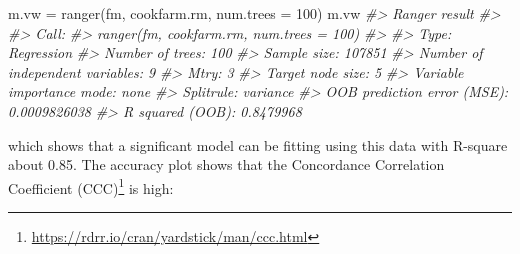 \documentclass[
  graybox,natbib,nospthms]{svmono}
\newenvironment{Shaded}{\begin{snugshade}}{\end{snugshade}}
\newcommand{\AttributeTok}[1]{\textcolor[rgb]{0.61,0.61,0.61}{#1}}
\newcommand{\CommentTok}[1]{\textcolor[rgb]{0.37,0.37,0.37}{\textit{#1}}}
\newcommand{\ConstantTok}[1]{\textcolor[rgb]{0,0,0}{#1}}
\newcommand{\DecValTok}[1]{\textcolor[rgb]{0.06,0.06,0.06}{#1}}
\newcommand{\FloatTok}[1]{\textcolor[rgb]{0.06,0.06,0.06}{#1}}
\newcommand{\FunctionTok}[1]{\textcolor[rgb]{0,0,0}{#1}}
\newcommand{\NormalTok}[1]{#1}
\newcommand{\OtherTok}[1]{\textcolor[rgb]{0.37,0.37,0.37}{#1}}
\newcommand{\SpecialCharTok}[1]{\textcolor[rgb]{0,0,0}{#1}}
\newcommand{\StringTok}[1]{\textcolor[rgb]{0.5,0.5,0.5}{#1}}
\renewcommand{\href}[2]{#2 (\url{#1})}
\renewcommand{\href}[2]{#2\footnote{\url{#1}}}
\begin{document}
\begin{Shaded}
\begin{Highlighting}[]
\NormalTok{m.vw }\OtherTok{=} \FunctionTok{ranger}\NormalTok{(fm, cookfarm.rm, }\AttributeTok{num.trees =} \DecValTok{100}\NormalTok{)}
\NormalTok{m.vw}
\CommentTok{\#\textgreater{} Ranger result}
\CommentTok{\#\textgreater{} }
\CommentTok{\#\textgreater{} Call:}
\CommentTok{\#\textgreater{}  ranger(fm, cookfarm.rm, num.trees = 100) }
\CommentTok{\#\textgreater{} }
\CommentTok{\#\textgreater{} Type:                             Regression }
\CommentTok{\#\textgreater{} Number of trees:                  100 }
\CommentTok{\#\textgreater{} Sample size:                      107851 }
\CommentTok{\#\textgreater{} Number of independent variables:  9 }
\CommentTok{\#\textgreater{} Mtry:                             3 }
\CommentTok{\#\textgreater{} Target node size:                 5 }
\CommentTok{\#\textgreater{} Variable importance mode:         none }
\CommentTok{\#\textgreater{} Splitrule:                        variance }
\CommentTok{\#\textgreater{} OOB prediction error (MSE):       0.0009826038 }
\CommentTok{\#\textgreater{} R squared (OOB):                  0.8479968}
\end{Highlighting}
\end{Shaded}

which shows that a significant model can be fitting using this data with
R-square about 0.85. The accuracy plot shows that the \href{https://rdrr.io/cran/yardstick/man/ccc.html}{Concordance Correlation Coefficient (CCC)}
is high:

\begin{Shaded}
\end{Shaded}
\end{document}
